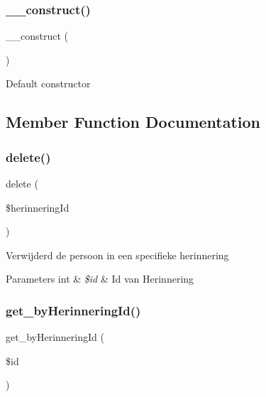 \subsubsection{\texorpdfstring{\+\_\+\+\_\+construct()}{\_\_construct()}}
{\footnotesize\ttfamily \+\_\+\+\_\+construct (\begin{DoxyParamCaption}{ }\end{DoxyParamCaption})}

Default constructor 

\subsection{Member Function Documentation}
\mbox{\label{class_persoon_in_herinnering__model_aa4b59888d725b40a291f7e241fe60203}} 
\subsubsection{\texorpdfstring{delete()}{delete()}}
{\footnotesize\ttfamily delete (\begin{DoxyParamCaption}\item[{}]{\$herinnering\+Id }\end{DoxyParamCaption})}

Verwijderd de persoon in een specifieke herinnering 
\begin{DoxyParams}[1]{Parameters}
int & {\em \$id} & Id van Herinnering \\
\hline
\end{DoxyParams}
\mbox{\label{class_persoon_in_herinnering__model_ae051e39373126f3d7e76165f5321b6f3}} 
\subsubsection{\texorpdfstring{get\+\_\+by\+Herinnering\+Id()}{get\_byHerinneringId()}}
{\footnotesize\ttfamily get\+\_\+by\+Herinnering\+Id (\begin{DoxyParamCaption}\item[{}]{\$id }\end{DoxyParamCaption})}

